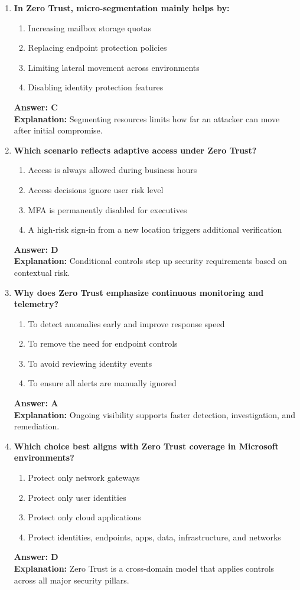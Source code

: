 \documentclass[10pt]{article}
\begin{document}
\begin{enumerate}[leftmargin=*]
\item \textbf{In Zero Trust, micro-segmentation mainly helps by:}
\begin{enumerate}[label=\Alph*.]
  \item Increasing mailbox storage quotas
  \item Replacing endpoint protection policies
  \item Limiting lateral movement across environments
  \item Disabling identity protection features
\end{enumerate}
\textbf{Answer: C}\\
\textbf{Explanation:} Segmenting resources limits how far an attacker can move after initial compromise.

\item \textbf{Which scenario reflects adaptive access under Zero Trust?}
\begin{enumerate}[label=\Alph*.]
  \item Access is always allowed during business hours
  \item Access decisions ignore user risk level
  \item MFA is permanently disabled for executives
  \item A high-risk sign-in from a new location triggers additional verification
\end{enumerate}
\textbf{Answer: D}\\
\textbf{Explanation:} Conditional controls step up security requirements based on contextual risk.

\item \textbf{Why does Zero Trust emphasize continuous monitoring and telemetry?}
\begin{enumerate}[label=\Alph*.]
  \item To detect anomalies early and improve response speed
  \item To remove the need for endpoint controls
  \item To avoid reviewing identity events
  \item To ensure all alerts are manually ignored
\end{enumerate}
\textbf{Answer: A}\\
\textbf{Explanation:} Ongoing visibility supports faster detection, investigation, and remediation.

\item \textbf{Which choice best aligns with Zero Trust coverage in Microsoft environments?}
\begin{enumerate}[label=\Alph*.]
  \item Protect only network gateways
  \item Protect only user identities
  \item Protect only cloud applications
  \item Protect identities, endpoints, apps, data, infrastructure, and networks
\end{enumerate}
\textbf{Answer: D}\\
\textbf{Explanation:} Zero Trust is a cross-domain model that applies controls across all major security pillars.


\end{enumerate}
\end{document}

